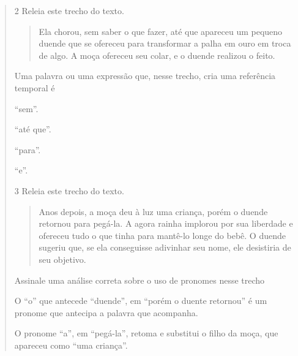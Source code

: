 \begin{quote}
\num{2} Releia este trecho do texto.

\begin{quote}
Ela chorou, sem saber o que fazer, até que apareceu um pequeno duende que se
ofereceu para transformar a palha em ouro em troca de algo. A moça
ofereceu seu colar, e o duende realizou o feito.
\end{quote}

Uma palavra ou uma expressão que, nesse trecho, cria uma referência temporal é

\begin{escolha}
\item “sem”.

\item “até que”.

\item “para”.

\item “e”.
\end{escolha}


\num{3} Releia este trecho do texto.

\begin{quote}
Anos depois, a moça deu à luz uma criança, porém o duende retornou para
pegá-la. A agora rainha implorou por sua liberdade e ofereceu tudo o que
tinha para mantê-lo longe do bebê. O duende sugeriu que, se ela
conseguisse adivinhar seu nome, ele desistiria de seu objetivo.
\end{quote}

Assinale uma análise correta sobre o uso de pronomes nesse trecho

\begin{escolha}
\item O “o” que antecede “duende”, em “porém o duente retornou” é um pronome que antecipa a palavra que acompanha.

\item O pronome “a”, em “pegá-la”, retoma e substitui o filho da moça, que apareceu como “uma criança”.


\end{escolha}
\end{quote}
